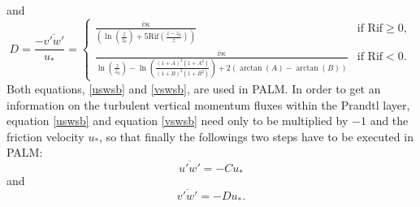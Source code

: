 \documentclass[11pt,a4paper,titlepage]{scrreprt}
\begin{document}
and
\begin{equation} \label{vswsb}
D=\frac{-\overline{v'w'}}{u_{\ast}} =
\begin{cases}
\frac{\overline{v} \kappa}{\left ( \ln \left ( \frac{z}{z_0} \right ) + 5 \text{Rif} \left ( \frac{z-z_0}{z} \right ) \right )} & \text{if $\text{Rif} \ge 0$}, \\
\frac{\overline{v} \kappa}{\ln \left ( \frac{z}{z_0} \right ) - \ln \left ( \frac{ \left ( 1+A \right )^2  \left ( 1+A^2 \right ) }{ \left ( 1+B \right )^2  \left ( 1+B^2 \right ) }\right ) + 2 \left ( \arctan(A) - \arctan(B) \right )} & \text{if $\text{Rif}<0$}.

\end{cases} 
\end{equation}
Both equations, \ref{uswsb} and \ref{vswsb}, are used in PALM. In order to get an information on the turbulent vertical momentum fluxes within the Prandtl layer, 
equation \ref{uswsb} and equation \ref{vswsb} need only to be multiplied by $-1$ and the friction velocity $u_{\ast}$, so that finally the followings two steps 
have to be executed in PALM: 
\begin{equation}
\overline{u'w'} = -C u_{\ast}
\end{equation}
and
\begin{equation}
\overline{v'w'} = -D u_{\ast}.
\end{equation}
\end{document}
